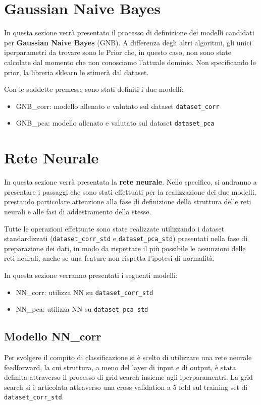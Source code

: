 \newpage
\section{Gaussian Naive Bayes}
In questa sezione verrà presentato il processo di definizione dei
modelli candidati per \textbf{Gaussian Naive Bayes} (GNB). A differenza 
degli altri algoritmi, gli unici iperparametri da trovare sono le Prior che, in 
questo caso, non sono state calcolate dal momento che non conosciamo l'attuale 
dominio. Non specificando le prior, la libreria sklearn le stimerà dal dataset.

Con le suddette premesse sono stati definiti i due modelli:
\begin{itemize}
    \item GNB\_corr: modello allenato e valutato sul dataset \texttt{dataset\_corr}
    \item GNB\_pca: modello allenato e valutato sul dataset \texttt{dataset\_pca}
\end{itemize}

\section{Rete Neurale}
In questa sezione verrà presentata la \textbf{rete neurale}. Nello specifico, si
andranno a presentare i passaggi che sono stati effettuati per la realizzazione
dei due modelli, prestando particolare attenzione alla fase di definizione
della struttura delle reti neurali e alle fasi di addestramento della stesse.

Tutte le operazioni effettuate sono state realizzate utilizzando i dataset standardizzati
(\texttt{dataset\_corr\_std} e \texttt{dataset\_pca\_std}) presentati nella fase
di preparazione dei dati, in modo da rispettare il più possibile le assunzioni
delle reti neurali, anche se una feature non rispetta l'ipotesi di normalità. 

In questa sezione verranno presentati i seguenti modelli:
\begin{itemize}
    \item NN\_corr: utilizza NN su \texttt{dataset\_corr\_std}
    \item NN\_pca: utilizza NN su \texttt{dataset\_pca\_std}
\end{itemize}

\subsection{Modello NN\_corr}
Per svolgere il compito di classificazione si è scelto di utilizzare una rete
neurale feedforward, la cui struttura, a meno del layer di input e di output, è
stata definita attraverso il processo di grid search insieme agli iperparamentri.
La grid search si è articolata attraverso una cross validation a $5$ fold sul training 
set di \texttt{dataset\_corr\_std}.

